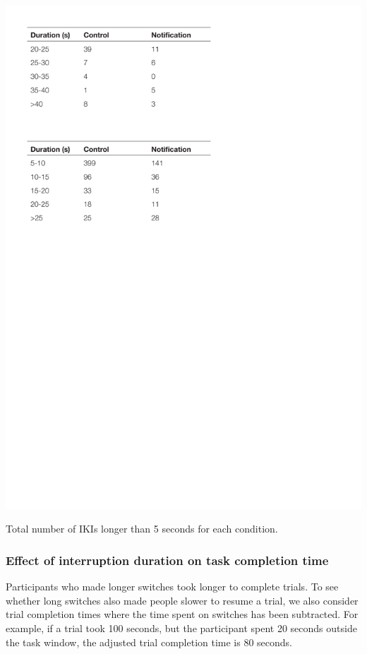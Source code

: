\begin{table}
\centering
\centerline{\includegraphics[scale=0.8]{images/ch56/ch56_LongIKIs.pdf}}
\caption[Study 6 frequency of long IKIs]{Total number of IKIs longer than 5 seconds for each condition.}
\label{tbl:ch56-tblikis}
\end{table}

\subsubsection{Effect of interruption duration on task completion time}
Participants who made longer switches took longer to complete trials. To see whether long switches also made people slower to resume a trial, we also consider trial completion times where the time spent on switches has been subtracted. For example, if a trial took 100 seconds, but the participant spent 20 seconds outside the task window, the adjusted trial completion time is 80 seconds.

